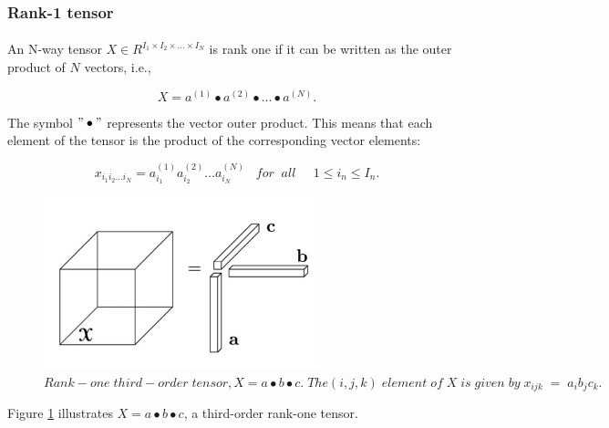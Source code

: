 \documentclass{report}
\begin{document}
\subsubsection{
	Rank-1 tensor
	\cite{kolda}
}

\paragraph*{}
An N-way tensor $ X \in R^{I_1\times I_2\times \dots \times I_N} $ is rank one if it
can be written as the outer product of $ N $ vectors, i.e.,



\begin{equation*}
X = a^{(1)} \bullet a^{(2)} \bullet \dots \bullet a^{(N)}.
\end{equation*} 

The symbol $"\bullet"$ represents the vector outer product. This means that each element
of the tensor is the product of the corresponding vector elements:


\begin{equation*}
x_{i_{1}i_{2}\dots i_{N}} = a^{(1)}
_{i_{1}} a^{(2)}
_{i_{2}} \dots a^{(N)}
_{i_{N}}\;\;
\;for \;\; all \;\;\;\;\; 1 \le i_n \le I_{n}.
\end{equation*} 



\begin{figure}[h!]
	\begin{center}
		\includegraphics[height=5cm]{rankone.png}
	\end{center}
	\label{rankone}
	\caption{$Rank-one\; third-order\; tensor, X = a \bullet b \bullet c.\; The (i, j, k)\; element\; of\; X \;is \;given \;by \;x_{ijk}\; =\;
		a_ib_jc_k.$}
\end{figure}


Figure
\ref{rankone}
illustrates $X = a \bullet b \bullet c$, a third-order rank-one tensor.
\end{document}
